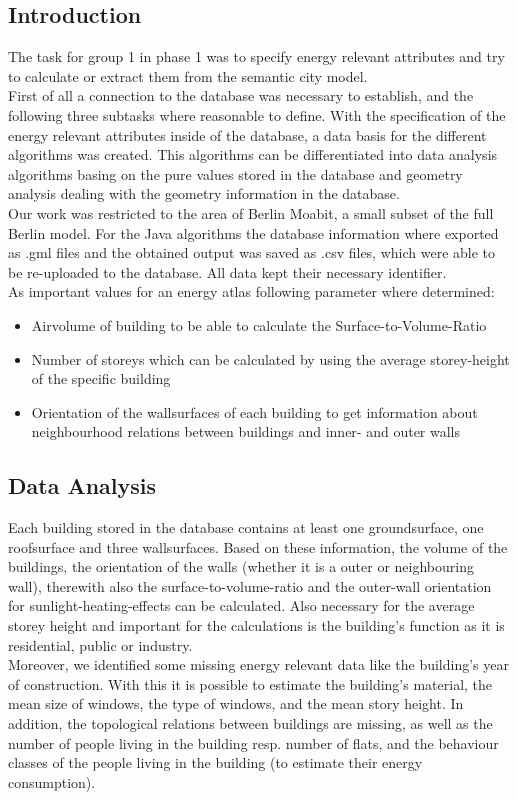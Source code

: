 \subsection{Introduction}
The task for group 1 in phase 1 was to specify energy relevant attributes and try to calculate or extract them from the semantic city model.\\
First of all a connection to the database was necessary to establish, and the following three subtasks where reasonable to define.
With the specification of the energy relevant attributes inside of the database, a data basis for the different algorithms was created. This algorithms can be differentiated into data analysis algorithms basing on the pure values stored in the database and geometry analysis dealing with the geometry information in the database.\\
Our work was restricted to the area of Berlin Moabit, a small subset of the full Berlin model. For the Java algorithms the database information where exported as .gml files and the obtained output was saved as .csv files, which were able to be re-uploaded to the database. All data kept their necessary identifier.\\
As important values for an energy atlas following parameter where determined:
\begin{itemize}
\item Airvolume of building to be able to calculate the Surface-to-Volume-Ratio
\item Number of storeys which can be calculated by using the average storey-height of the specific building
\item Orientation of the wallsurfaces of each building to get information about neighbourhood relations between buildings and inner- and outer walls
\end{itemize}

\subsection{Data Analysis}
Each building stored in the database contains at least one groundsurface, one roofsurface and three wallsurfaces. Based on these information, the volume of the buildings, the orientation of the walls (whether it is a outer or neighbouring wall), therewith also the surface-to-volume-ratio and the outer-wall orientation for sunlight-heating-effects can be calculated. Also necessary for the average storey height and important for the calculations is the building’s function as it is residential, public or industry.\\
Moreover, we identified some missing energy relevant data like the building's year of construction. With this it is possible to estimate the building's material, the mean size of windows, the type of windows, and the mean story height. In addition, the topological relations between buildings are missing, as well as the number of people living in the building resp. number of flats, and the behaviour classes of the people living in the building (to estimate their energy consumption).

